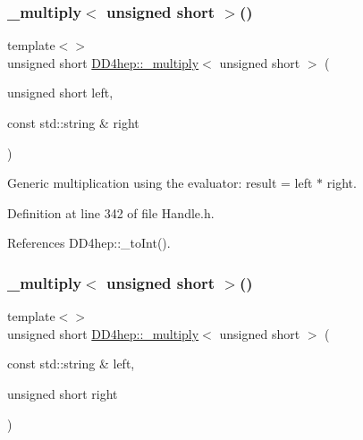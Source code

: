 \subsubsection{\texorpdfstring{\+\_\+multiply$<$ unsigned short $>$()}{\_multiply< unsigned short >()}\hspace{0.1cm}{\footnotesize\ttfamily [2/3]}}
{\footnotesize\ttfamily template$<$$>$ \\
unsigned short \hyperlink{group___d_d4_h_e_p___g_e_o_m_e_t_r_y_gab860c2299e2eb50e537c5079fb0c9c51}{D\+D4hep\+::\+\_\+multiply}$<$ unsigned short $>$ (\begin{DoxyParamCaption}\item[{unsigned short}]{left,  }\item[{const std\+::string \&}]{right }\end{DoxyParamCaption})\hspace{0.3cm}{\ttfamily [inline]}}



Generic multiplication using the evaluator\+: result = left $\ast$ right. 



Definition at line 342 of file Handle.\+h.



References D\+D4hep\+::\+\_\+to\+Int().

\hypertarget{group___d_d4_h_e_p___g_e_o_m_e_t_r_y_ga2b3d4e46a8022a46fa452eda0e9c538d}{}\label{group___d_d4_h_e_p___g_e_o_m_e_t_r_y_ga2b3d4e46a8022a46fa452eda0e9c538d} 
\subsubsection{\texorpdfstring{\+\_\+multiply$<$ unsigned short $>$()}{\_multiply< unsigned short >()}\hspace{0.1cm}{\footnotesize\ttfamily [3/3]}}
{\footnotesize\ttfamily template$<$$>$ \\
unsigned short \hyperlink{group___d_d4_h_e_p___g_e_o_m_e_t_r_y_gab860c2299e2eb50e537c5079fb0c9c51}{D\+D4hep\+::\+\_\+multiply}$<$ unsigned short $>$ (\begin{DoxyParamCaption}\item[{const std\+::string \&}]{left,  }\item[{unsigned short}]{right }\end{DoxyParamCaption})\hspace{0.3cm}{\ttfamily [inline]}}



